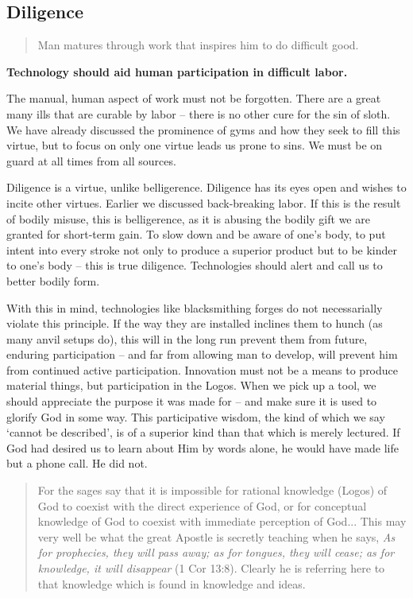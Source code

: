\documentclass[letterpaper]{article}
\begin{document}
  \subsection{Diligence}

    \begin{quote}
      Man matures through work that inspires him to do difficult good.
    \end{quote}

    \textbf{Technology should aid human participation in difficult labor.}

    The manual, human aspect of work must not be forgotten. There are a great many ills that are curable by labor -- there is no other cure for the sin of sloth. We have already discussed the prominence of gyms and how they seek to fill this virtue, but to focus on only one virtue leads us prone to sins. We must be on guard at all times from all sources.

    Diligence is a virtue, unlike belligerence. Diligence has its eyes open and wishes to incite other virtues. Earlier we discussed back-breaking labor. If this is the result of bodily misuse, this is belligerence, as it is abusing the bodily gift we are granted for short-term gain. To slow down and be aware of one's body, to put intent into every stroke not only to produce a superior product but to be kinder to one's body -- this is true diligence. Technologies should alert and call us to better bodily form.

    With this in mind, technologies like blacksmithing forges do not necessarially violate this principle. If the way they are installed inclines them to hunch (as many anvil setups do), this will in the long run prevent them from future, enduring participation -- and far from allowing man to develop, will prevent him from continued active participation. Innovation must not be a means to produce material things, but participation in the Logos. When we pick up a tool, we should appreciate the purpose it was made for -- and make sure it is used to glorify God in some way. This participative wisdom, the kind of which we say `cannot be described', is of a superior kind than that which is merely lectured. If God had desired us to learn about Him by words alone, he would have made life but a phone call. He did not.

    \begin{quote}
      For the sages say that it is impossible for rational knowledge (Logos) of God to coexist with the direct experience of God, or for conceptual knowledge of God to coexist with immediate perception of God... This may very well be what the great Apostle is secretly teaching when he says, \textit{As for prophecies, they will pass away; as for tongues, they will cease; as for knowledge, it will disappear} (1 Cor 13:8). Clearly he is referring here to that knowledge which is found in knowledge and ideas.
    \end{quote}
\end{document}
